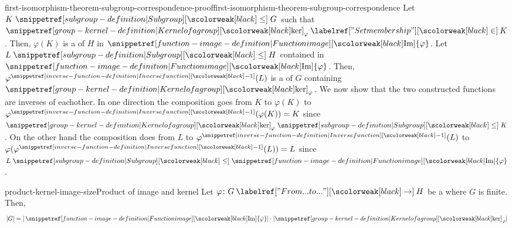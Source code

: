 \documentclass[preview]{standalone}
\begin{document}
\begin{snippetproof}{first-isomorphism-theorem-subgroup-correspondence-proof}{first-isomorphism-theorem-subgroup-correspondence}{}
    Let \(K \subgroupleq G\) such that \(\grpker_\varphi \in K\).
    Then, \(\varphi(K)\) is a \subgroup of \(H\) in \(\image\{\varphi\}\).
    Let \(L \subgroupleq H\) contained in \(\image\{\varphi\}\).
    Then, \(\varphi^\inversefunction(L)\) is a \subgroup of \(G\)
    containing \(\grpker_\varphi\).
    We now show that the two constructed functions are inverses of eachother.
    In one direction the composition goes from \(K\) to \(\varphi(K)\)
    to \(\varphi^\inversefunction(\varphi(K)) = K\) since \(\grpker_\varphi \subgroupleq K\).
    On the other hand the composition does from \(L\)
    to \(\varphi^\inversefunction(L)\) to \(\varphi(\varphi^\inversefunction(L)) = L\)
    since \(L \subgroupleq \image\{\varphi\}\).
\end{snippetproof}

\begin{snippetproposition}{product-kernel-image-size}{Product of image and kernel}
    Let \(\varphi \colon G \fromto H\) be a \grouphomomorphism
    where \(G\) is finite. Then,
    \[
        |G| = |\image\{\varphi\}| \cdot |\grpker_\varphi|
    \]
\end{snippetproposition}

\end{document}
